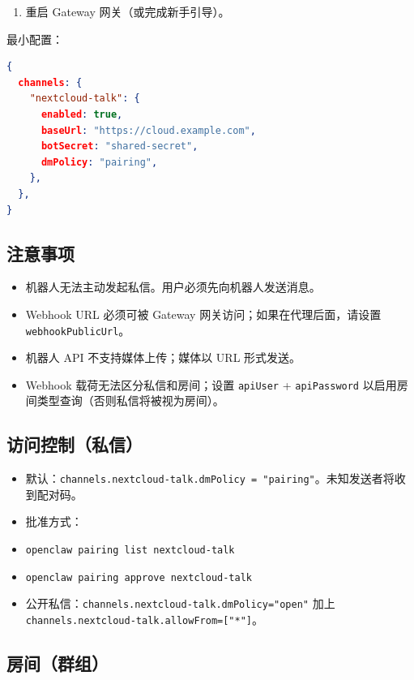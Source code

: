 \begin{enumerate}
  \item 重启 Gateway 网关（或完成新手引导）。
\end{enumerate}


最小配置：

\begin{lstlisting}[language=json]
{
  channels: {
    "nextcloud-talk": {
      enabled: true,
      baseUrl: "https://cloud.example.com",
      botSecret: "shared-secret",
      dmPolicy: "pairing",
    },
  },
}
\end{lstlisting}


\subsection{注意事项}


\begin{itemize}
  \item 机器人无法主动发起私信。用户必须先向机器人发送消息。
  \item Webhook URL 必须可被 Gateway 网关访问；如果在代理后面，请设置 \texttt{webhookPublicUrl}。
  \item 机器人 API 不支持媒体上传；媒体以 URL 形式发送。
  \item Webhook 载荷无法区分私信和房间；设置 \texttt{apiUser} + \texttt{apiPassword} 以启用房间类型查询（否则私信将被视为房间）。
\end{itemize}


\subsection{访问控制（私信）}


\begin{itemize}
  \item 默认：\texttt{channels.nextcloud-talk.dmPolicy = "pairing"}。未知发送者将收到配对码。
  \item 批准方式：
  \item \texttt{openclaw pairing list nextcloud-talk}
  \item \texttt{openclaw pairing approve nextcloud-talk }
  \item 公开私信：\texttt{channels.nextcloud-talk.dmPolicy="open"} 加上 \texttt{channels.nextcloud-talk.allowFrom=["*"]}。
\end{itemize}


\subsection{房间（群组）}


